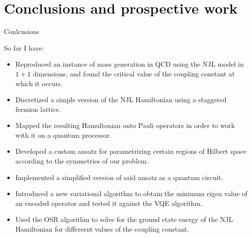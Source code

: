\documentclass[9pt, handout, aspectratio=169]{beamer}	%
\begin{document}

\section{Conclusions and prospective work}

\begin{frame}{Conlcusions}

	So far I have:

	\begin{itemize}
		\item Reproduced an instance of mass generation in QCD using the NJL model in $1+1$ dimensions, and found the critical value of the coupling constant at which it occurs.
		\item Discretized a simple version of the NJL Hamiltonian using a staggered fermion lattice.
		\item Mapped the resulting Hamultonian onto Pauli operators in order to work with it on a quantum processor.
		\item Developed a custom ansatz for parametrizing certain regions of Hilbert space according to the symmetries of our problem.
		\item Implemented a simplified version of said ansatz as a quantum circuit.
		\item Introduced a new variational algorithm to obtain the minimum eigen value of an encoded operator and tested it against the VQE algorithm.
		\item Used the OSR algorithm to solve for the ground state energy of the NJL Hamiltonian for differernt values of the coupling constant.
	\end{itemize}

\end{frame}

\end{document}
